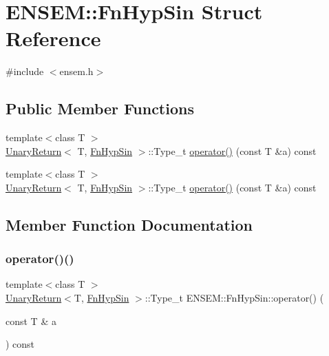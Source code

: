 \hypertarget{structENSEM_1_1FnHypSin}{}\section{E\+N\+S\+EM\+:\+:Fn\+Hyp\+Sin Struct Reference}
\label{structENSEM_1_1FnHypSin}


{\ttfamily \#include $<$ensem.\+h$>$}

\subsection*{Public Member Functions}
\begin{DoxyCompactItemize}
\item 
{\footnotesize template$<$class T $>$ }\\\mbox{\hyperlink{structENSEM_1_1UnaryReturn}{Unary\+Return}}$<$ T, \mbox{\hyperlink{structENSEM_1_1FnHypSin}{Fn\+Hyp\+Sin}} $>$\+::Type\+\_\+t \mbox{\hyperlink{structENSEM_1_1FnHypSin_a21db44c9d0efe64e1e59ceae24fc7d48}{operator()}} (const T \&a) const
\item 
{\footnotesize template$<$class T $>$ }\\\mbox{\hyperlink{structENSEM_1_1UnaryReturn}{Unary\+Return}}$<$ T, \mbox{\hyperlink{structENSEM_1_1FnHypSin}{Fn\+Hyp\+Sin}} $>$\+::Type\+\_\+t \mbox{\hyperlink{structENSEM_1_1FnHypSin_a21db44c9d0efe64e1e59ceae24fc7d48}{operator()}} (const T \&a) const
\end{DoxyCompactItemize}


\subsection{Member Function Documentation}
\mbox{\label{structENSEM_1_1FnHypSin_a21db44c9d0efe64e1e59ceae24fc7d48}} 
\subsubsection{\texorpdfstring{operator()()}{operator()()}\hspace{0.1cm}{\footnotesize\ttfamily [1/2]}}
{\footnotesize\ttfamily template$<$class T $>$ \\
\mbox{\hyperlink{structENSEM_1_1UnaryReturn}{Unary\+Return}}$<$T, \mbox{\hyperlink{structENSEM_1_1FnHypSin}{Fn\+Hyp\+Sin}} $>$\+::Type\+\_\+t E\+N\+S\+E\+M\+::\+Fn\+Hyp\+Sin\+::operator() (\begin{DoxyParamCaption}\item[{const T \&}]{a }\end{DoxyParamCaption}) const\hspace{0.3cm}{\ttfamily [inline]}}

